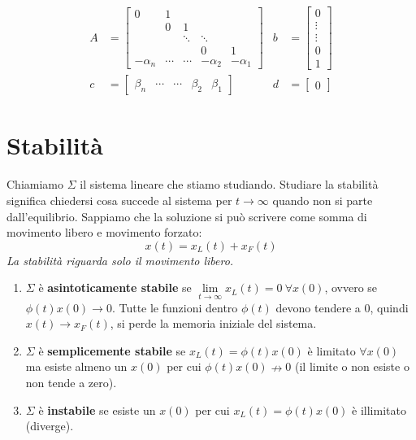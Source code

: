 \documentclass[10pt,a4paper]{book}
\begin{document}
\begin{equation*}
	\begin{aligned}
		A & =\begin{bmatrix}
		0          & 1      &        &            &            \\
		           & 0      & 1      &            &            \\
		           &        & \ddots & \ddots     &            \\
		           &        &        & 0          & 1          \\
		-\alpha _n & \cdots & \cdots & -\alpha _2 & -\alpha _1 
		\end{bmatrix} & b & =\begin{bmatrix}
		0\\
		\vdots \\
		\vdots \\
		0\\
		1
		\end{bmatrix}\\
		c & =\begin{bmatrix}
		\beta _n   & \cdots & \cdots & \beta _2   & \beta _1   
		\end{bmatrix} & d & =\begin{bmatrix}
		0
		\end{bmatrix}
	\end{aligned}
\end{equation*}
\chapter{Stabilità}

Chiamiamo $\Sigma $ il sistema lineare che stiamo studiando. Studiare la stabilità significa chiedersi cosa succede al sistema per $t\rightarrow \infty $ quando non si parte dall'equilibrio. Sappiamo che la soluzione si può scrivere come somma di movimento libero e movimento forzato:
\begin{equation*}
	x\left(t\right) =x_L\left(t\right) +x_F\left(t\right)
\end{equation*}
\textit{La stabilità riguarda solo il movimento libero.}
\begin{enumerate}
	\item $\Sigma $ è \textbf{asintoticamente stabile} se $\lim\limits _{t\rightarrow \infty } x_L\left(t\right) =0\ \forall x\left(0\right)$, ovvero se $\phi \left(t\right) x\left(0\right)\rightarrow 0$. Tutte le funzioni dentro $\phi \left(t\right)$ devono tendere a $0$, quindi $x\left(t\right)\rightarrow x_F\left(t\right)$, si perde la memoria iniziale del sistema.
	\item $\Sigma $ è \textbf{semplicemente stabile} se $x_L\left(t\right) =\phi \left(t\right) x\left(0\right)$ è limitato $\forall x\left(0\right)$ ma esiste almeno un $x\left(0\right)$ per cui $\phi \left(t\right) x\left(0\right) \nrightarrow 0$ (il limite o non esiste o non tende a zero).
	\item $\Sigma $ è \textbf{instabile} se esiste un $x\left(0\right)$ per cui $x_L\left(t\right) =\phi \left(t\right) x\left(0\right)$ è illimitato (diverge).
\end{enumerate}
\end{document}
